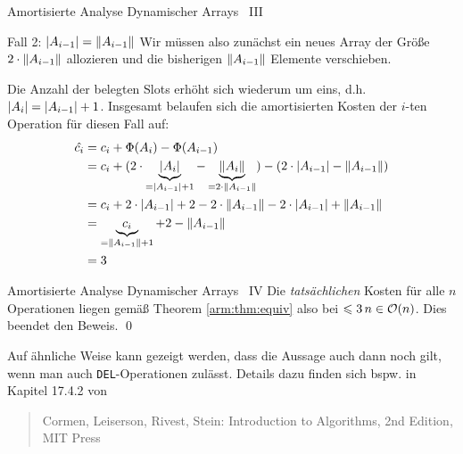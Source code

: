 \begin{frame}{Amortisierte Analyse Dynamischer Arrays \, III}
\begin{block}{Fall 2: $\vert A_{i-1}\vert = \lVert A_{i-1}\rVert$}
Wir m\"ussen also zun\"achst ein neues Array der Gr\"o{\ss}e $2 \cdot \lVert A_{i-1}\rVert$ allozieren und die bisherigen $\lVert A_{i-1}\rVert$ Elemente verschieben.

Die Anzahl der belegten Slots erh\"oht sich wiederum um eins, d.h. $\vert A_i\vert = \vert A_{i-1}\vert + 1$.
Insgesamt belaufen sich die amortisierten Kosten der $i$-ten Operation f\"ur diesen Fall auf:
\begin{align*}
    \hat{c_i} &= c_i + \Phi(A_i) - \Phi(A_{i-1}) \\
    &= c_i + (2 \cdot \underbrace{\vert A_i\vert}_{= \vert A_{i-1}\vert + 1} - \underbrace{\lVert A_i\rVert}_{=2\cdot \lVert A_{i-1}\rVert}) - (2 \cdot \vert A_{i-1}\vert - \lVert A_{i-1}\rVert) \\
    &= c_i + 2 \cdot \vert A_{i-1}\vert + 2 - 2 \cdot \lVert A_{i-1}\rVert - 2 \cdot \vert A_{i-1}\vert + \lVert A_{i-1}\rVert \\
    &= \underbrace{c_i}_{=\lVert A_{i-1}\rVert + 1} + 2 - \lVert A_{i-1}\rVert \\
    &= 3
\end{align*}
\end{block}
\end{frame}

\begin{frame}{Amortisierte Analyse Dynamischer Arrays \, IV}
Die \emph{tats\"achlichen} Kosten f\"ur alle $n$ Operationen liegen gem\"a{\ss} Theorem \ref{arm:thm:equiv} also bei $\leqslant 3 \, n \in \mathcal{O}(n)$.
Dies beendet den Beweis. \qed

\begin{remark}
Auf \"ahnliche Weise kann gezeigt werden, dass die Aussage auch dann noch gilt, wenn man auch \texttt{DEL}-Operationen zul\"asst.
Details dazu finden sich bspw. in Kapitel 17.4.2 von

\begin{quote}
    Cormen, Leiserson, Rivest, Stein: Introduction to Algorithms, 2nd Edition, MIT Press
\end{quote}
\end{remark}
\end{frame}
